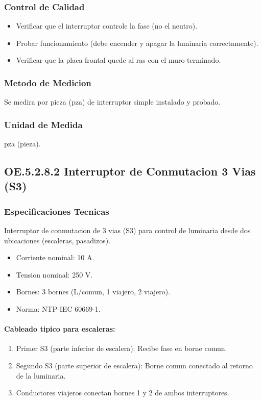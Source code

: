 \subsubsection{Control de Calidad}

\begin{itemize}
  \item Verificar que el interruptor controle la fase (no el neutro).
  \item Probar funcionamiento (debe encender y apagar la luminaria correctamente).
  \item Verificar que la placa frontal quede al ras con el muro terminado.
\end{itemize}

\subsubsection{Metodo de Medicion}

Se medira por pieza (pza) de interruptor simple instalado y probado.

\subsubsection{Unidad de Medida}

pza (pieza).

\subsection{OE.5.2.8.2 Interruptor de Conmutacion 3 Vias (S3)}

\subsubsection{Especificaciones Tecnicas}

Interruptor de conmutacion de 3 vias (S3) para control de luminaria desde dos ubicaciones (escaleras, pasadizos).

\begin{itemize}[nosep]
  \item Corriente nominal: 10 A.
  \item Tension nominal: 250 V.
  \item Bornes: 3 bornes (L/comun, 1 viajero, 2 viajero).
  \item Norma: NTP-IEC 60669-1.
\end{itemize}

\paragraph{Cableado tipico para escaleras:}
\begin{enumerate}
  \item Primer S3 (parte inferior de escalera): Recibe fase en borne comun.
  \item Segundo S3 (parte superior de escalera): Borne comun conectado al retorno de la luminaria.
  \item Conductores viajeros conectan bornes 1 y 2 de ambos interruptores.
\end{enumerate}

